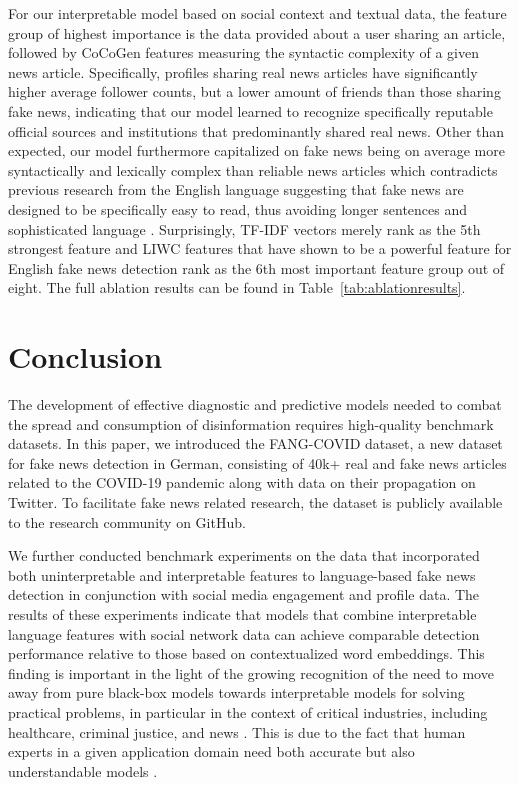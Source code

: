 \documentclass[11pt]{article}
\begin{document}
For our interpretable model based on social context and textual data, the feature group of highest importance is the data provided about a user sharing an article, followed by CoCoGen features measuring the syntactic complexity of a given news article. Specifically, profiles sharing real news articles have significantly higher average follower counts, but a lower amount of friends than those sharing fake news, indicating that our model learned to recognize specifically reputable official sources and institutions that predominantly shared real news. Other than expected, our model furthermore capitalized on fake news being on average more syntactically and lexically complex than reliable news articles which contradicts previous research from the English language suggesting that fake news are designed to be specifically easy to read, thus avoiding longer sentences and sophisticated language \citep{horne2017just}. Surprisingly, TF-IDF vectors merely rank as the 5th strongest feature and LIWC features that have shown to be a powerful feature for English fake news detection \citep{qiao-etal-2020-language, 10.1145/3292500.3330935} rank as the 6th most important feature group out of eight. The full ablation results can be found in Table~\ref{tab:ablationresults}.


\section{Conclusion}

The development of effective diagnostic and predictive models needed to combat the spread and consumption of disinformation requires  high-quality benchmark datasets. In this paper, we introduced the FANG-COVID dataset, a new  dataset for fake news detection in German, consisting of 40k+ real and fake news articles related to the COVID-19 pandemic along with data on their propagation on Twitter. To facilitate fake news related research, the dataset is publicly available to the research community on GitHub. 

We further conducted benchmark experiments on the data that incorporated both uninterpretable and interpretable features to language-based fake news detection in conjunction with social media engagement and profile data. The results of these experiments indicate that models that combine interpretable language features with social network data can achieve comparable detection performance relative to those based on contextualized word embeddings. This finding is important in the light of the growing recognition of the need to move away from pure black-box models towards interpretable models for solving practical problems, in particular in the context of critical industries, including healthcare, criminal justice, and news \citep{rudin2019stop}. This is due to the fact that human experts in a given application domain need both accurate but also understandable models \citep{loyola2019black}. 
\end{document}
